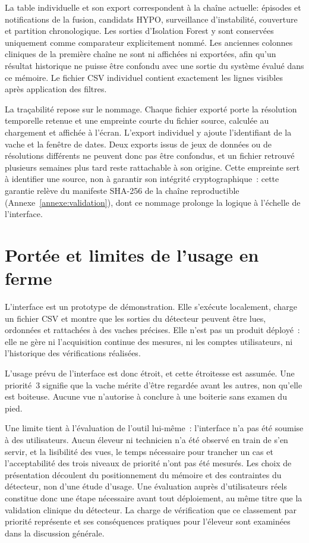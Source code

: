 La table individuelle et son export correspondent à la chaîne actuelle: épisodes et
notifications de la fusion, candidats HYPO, surveillance d'instabilité, couverture et
partition chronologique. Les sorties d'Isolation Forest y sont conservées uniquement comme
comparateur explicitement nommé. Les anciennes colonnes cliniques de la première chaîne ne
sont ni affichées ni exportées, afin qu'un résultat historique ne puisse être confondu avec
une sortie du système évalué dans ce mémoire. Le fichier CSV individuel contient exactement
les lignes visibles après application des filtres.

La traçabilité repose sur le nommage. Chaque fichier exporté porte la résolution temporelle
retenue et une empreinte courte du fichier source, calculée au chargement et affichée à
l'écran. L'export individuel y ajoute l'identifiant de la vache et la fenêtre de dates. Deux
exports issus de jeux de données ou de résolutions différents ne peuvent donc pas être
confondus, et un fichier retrouvé plusieurs semaines plus tard reste rattachable à son
origine. Cette empreinte sert à identifier une source, non à garantir son intégrité
cryptographique~: cette garantie relève du manifeste SHA-256 de la chaîne reproductible
(Annexe~\ref{annexe:validation}), dont ce nommage prolonge la logique à l'échelle de
l'interface.

\section{Portée et limites de l'usage en ferme}
L'interface est un prototype de démonstration. Elle s'exécute localement, charge un fichier
CSV et montre que les sorties du détecteur peuvent être lues, ordonnées et rattachées à des
vaches précises. Elle n'est pas un produit déployé~: elle ne gère ni l'acquisition continue
des mesures, ni les comptes utilisateurs, ni l'historique des vérifications réalisées.

L'usage prévu de l'interface est donc étroit, et cette étroitesse est assumée. Une priorité~3 signifie que
la vache mérite d'être regardée avant les autres, non qu'elle est boiteuse. Aucune vue
n'autorise à conclure à une boiterie sans examen du pied.

Une limite tient à l'évaluation de l'outil lui-même~: l'interface n'a pas été soumise à des
utilisateurs. Aucun éleveur ni technicien n'a été observé en train de s'en servir, et la
lisibilité des vues, le temps nécessaire pour trancher un cas et l'acceptabilité des
trois niveaux de priorité n'ont pas été mesurés. Les choix de présentation découlent du
positionnement du mémoire et des contraintes du détecteur, non d'une étude d'usage. Une
évaluation auprès d'utilisateurs réels constitue donc une étape nécessaire avant tout
déploiement, au même titre que la validation clinique du détecteur. La charge de vérification
que ce classement par priorité représente et ses conséquences pratiques pour l'éleveur sont examinées dans la
discussion générale.

